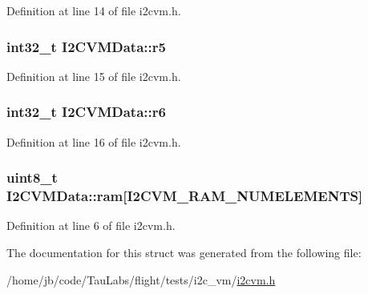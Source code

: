 \-Definition at line 14 of file i2cvm.\-h.

\hypertarget{struct_i2_c_v_m_data_a0cc4a4425c2f8d447a8629b6102db6d5}{
\subsubsection[{r5}]{\setlength{\rightskip}{0pt plus 5cm}int32\-\_\-t {\bf \-I2\-C\-V\-M\-Data\-::r5}}}\label{struct_i2_c_v_m_data_a0cc4a4425c2f8d447a8629b6102db6d5}


\-Definition at line 15 of file i2cvm.\-h.

\hypertarget{struct_i2_c_v_m_data_a44579b97441bc54acb0deed60dff7a1f}{
\subsubsection[{r6}]{\setlength{\rightskip}{0pt plus 5cm}int32\-\_\-t {\bf \-I2\-C\-V\-M\-Data\-::r6}}}\label{struct_i2_c_v_m_data_a44579b97441bc54acb0deed60dff7a1f}


\-Definition at line 16 of file i2cvm.\-h.

\hypertarget{struct_i2_c_v_m_data_aa78a321c590d3f7b5d503b948813c509}{
\subsubsection[{ram}]{\setlength{\rightskip}{0pt plus 5cm}uint8\-\_\-t {\bf \-I2\-C\-V\-M\-Data\-::ram}\mbox{[}\-I2\-C\-V\-M\-\_\-\-R\-A\-M\-\_\-\-N\-U\-M\-E\-L\-E\-M\-E\-N\-T\-S\mbox{]}}}\label{struct_i2_c_v_m_data_aa78a321c590d3f7b5d503b948813c509}


\-Definition at line 6 of file i2cvm.\-h.



\-The documentation for this struct was generated from the following file\-:\begin{DoxyCompactItemize}
\item 
/home/jb/code/\-Tau\-Labs/flight/tests/i2c\-\_\-vm/\hyperlink{flight_2tests_2i2c__vm_2i2cvm_8h}{i2cvm.\-h}\end{DoxyCompactItemize}
